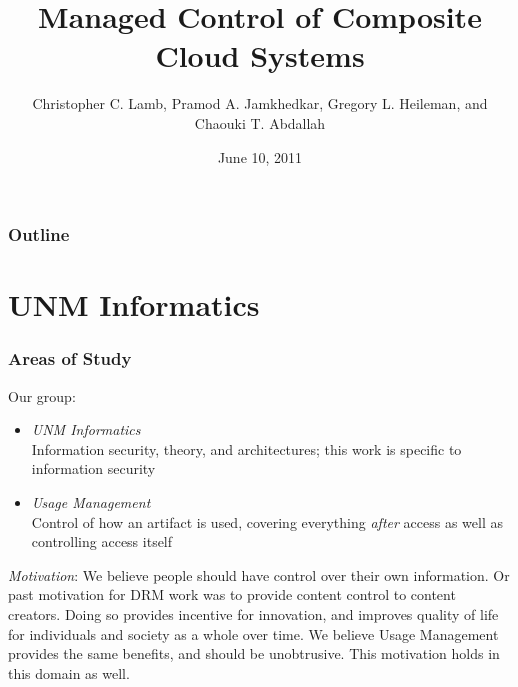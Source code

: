 \documentclass[t, 10pt]{beamer}
\title{Managed Control of Composite Cloud Systems}
\author [Chris]{Christopher C. Lamb, Pramod A. Jamkhedkar, Gregory L. Heileman, and Chaouki T. Abdallah}
\institute[University of New Mexico]{
\inst {}Department of Electrical and Computer Engineering\\
University of New Mexico}
\date{June 10, 2011}
\begin{document}
\begin{frame}
\titlepage
\end{frame}


\begin{frame}
\frametitle{Outline}
\tableofcontents 
\end{frame}

\section{UNM Informatics}
\begin{frame}
\frametitle{Areas of Study}

Our group:
\begin{itemize}
\item \textit{UNM Informatics} \\
 Information security, theory, and architectures; this work is specific to information security 
\item \textit{Usage Management} \\
Control of how an artifact is used, covering everything \textit{after} access as well as controlling access itself
\end{itemize}

\textit{Motivation}: We believe people should have control over their own information.  Or past motivation for DRM work was to provide content control to content creators.  Doing so provides incentive for innovation, and improves quality of life for individuals and society as a whole over time.  We believe Usage Management provides the same benefits, and should be unobtrusive.
\newline
\newline
This motivation holds in this domain as well.
\end{frame}
\end{document}
